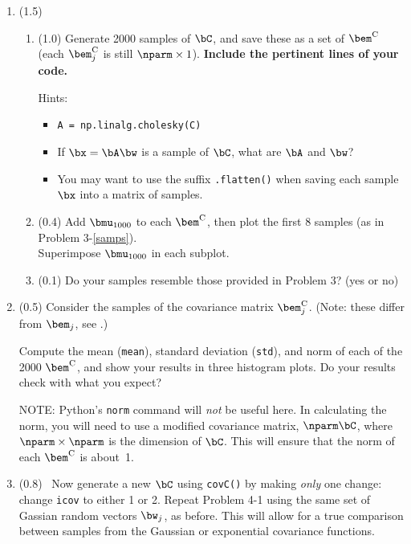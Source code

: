 \documentclass[11pt,titlepage,fleqn]{article}
\begin{document}
\begin{enumerate}
\item (1.5) 

\begin{enumerate}
\item (1.0) Generate 2000 samples of $\bC$, and save these as a set of $\bem^{\rm C}$ (each $\bem_j^{\rm C}$ is still $\nparm \times 1$). {\bf Include the pertinent lines of your code.}

Hints:
%
\begin{itemize}
\item \verb+A = np.linalg.cholesky(C)+
\item If $\bx = \bA\bw$ is a sample of $\bC$, what are $\bA$ and $\bw$?
\item You may want to use the suffix \verb+.flatten()+ when saving each sample $\bx$ into a matrix of samples.
\end{itemize}

\item (0.4) Add $\bmu_{1000}$ to each $\bem^{\rm C}$, then plot the first 8 samples (as in Problem 3-\ref{samps}). \\
Superimpose $\bmu_{1000}$ in each subplot.

\item (0.1) Do your samples resemble those provided in Problem 3? (yes or no)
\end{enumerate}


\item (0.5) Consider the samples of the covariance matrix $\bem_j^{\rm C}$. (Note: these differ from $\bem_j$, see .)

Compute the mean (\verb+mean+), standard deviation (\verb+std+), and norm of each of the 2000 $\bem^{\rm C}$, and show your results in three histogram plots. Do your results check with what you expect?

NOTE: Python's \verb+norm+ command will {\em not} be useful here. In calculating the norm, you will need to use a modified covariance matrix, $\nparm\bC$, where $\nparm\times\nparm$ is the dimension of $\bC$. This will ensure that the norm of each $\bem^{\rm C}$ is about~1.


\item (0.8) \ptag\ Now generate a new $\bC$ using \verb+covC()+ by making {\em only} one change: change \verb+icov+ to either 1 or 2. Repeat Problem 4-1 using the same set of Gassian random vectors $\bw_j$, as before. This will allow for a true comparison between samples from the Gaussian or exponential covariance functions.


\end{enumerate}
\end{document}
